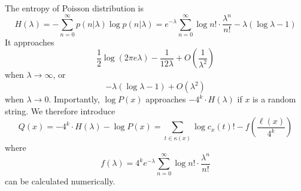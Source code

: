 \documentclass[10pt]{article}
\begin{document}

The entropy of Poisson distribution is
$$
H(\lambda)=-\sum_{n=0}^\infty p(n|\lambda)\log p(n|\lambda)
=e^{-\lambda}\sum_{n=0}^\infty\log n!\cdot\frac{\lambda^n}{n!}-\lambda(\log\lambda-1)
$$
It approaches 
$$
\frac{1}{2}\log(2\pi e\lambda)-\frac{1}{12\lambda}+O\left(\frac{1}{\lambda^2}\right)
$$
when $\lambda\to\infty$, or
$$
-\lambda(\log\lambda-1)+O(\lambda^2)
$$
when $\lambda\to0$.
Importantly, $\log P(x)$ approaches $-4^k\cdot H(\lambda)$ if $x$ is a random string.
We therefore introduce
$$
Q(x)=-4^k\cdot H(\lambda)-\log P(x)=\sum_{t\in\kappa(x)}\log c_x(t)!-f\left(\frac{\ell(x)}{4^k}\right)
$$
where
$$
f(\lambda)=4^ke^{-\lambda}\sum_{n=0}^\infty\log n!\cdot\frac{\lambda^n}{n!}
$$
can be calculated numerically.
\end{document}
